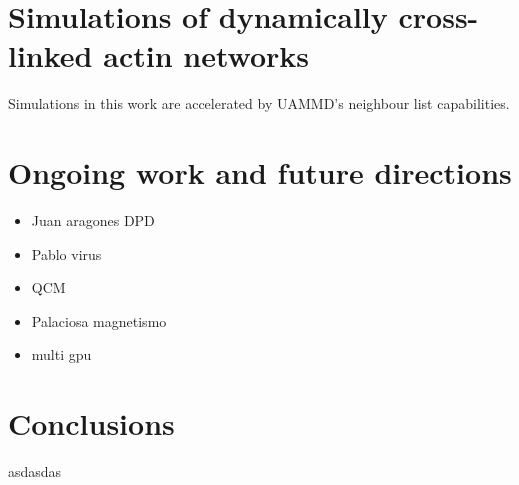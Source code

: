 \documentclass[ twoside,openright,titlepage,numbers=noenddot,%
headinclude,footinclude,cleardoublepage=empty,abstract=on,
BCOR=5mm,paper=a4,fontsize=11pt, dvipsnames
]{scrreprt}
\newcommand{\uammd}{\gls{UAMMD}\xspace}
\begin{document}
\chapter{Simulations of dynamically cross-linked actin networks}
Simulations in this work are accelerated by \uammd's neighbour list capabilities.

\chapter{Ongoing work and future directions}\label{ch:ongoing}

\begin{itemize}
\item Juan aragones DPD
\item Pablo virus
\item QCM
\item Palaciosa magnetismo
\item multi gpu
\end{itemize}

\chapter{Conclusions}\label{ch:conclusions}

asdasdas
\end{document}
